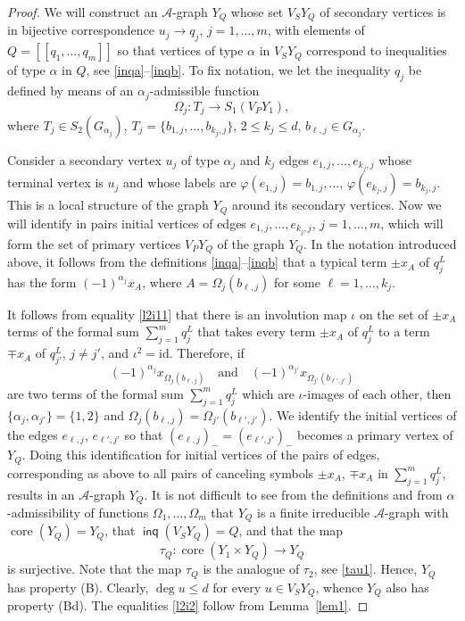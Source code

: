 \documentclass[10pt, reqno]{amsart}
\numberwithin{equation}{section}
\begin{document}
\begin{proof} We will construct an ${\mathcal{A}}$-graph $Y_Q$ whose set $V_S Y_Q$   of secondary vertices is in bijective correspondence $u_j \to q_j$, $j=1, \dots, m$, with elements of $Q = [[ q_1, \dots, q_m ]]$ so that vertices of type ${\alpha}$ in  $V_S Y_Q$ correspond to inequalities of type ${\alpha}$ in $Q$, see \eqref{inqa}--\eqref{inqb}. To fix notation, we
let the inequality  $q_j$ be defined by means of an ${\alpha}_j$-admissible function
$$
{\Omega}_j : T_j \to S_1( V_P Y_1) ,
$$
where $T_j \in S_2(G_{{\alpha}_j})$, $T_j = \{ b_{1,j}, \dots, b_{k_j, j}\}$,
 $2 \le  k_j \le d$, $b_{\ell, j} \in  G_{{\alpha}_j}$.

 Consider a secondary vertex $u_j$ of type ${\alpha}_j$ and $k_j$ edges $e_{1,j}, \dots, e_{k_j, j}$ whose terminal vertex is $u_j$ and whose labels are ${\varphi}(e_{1,j}) = b_{1,j}, \dots$, ${\varphi}(e_{k_j, j}) = b_{k_j, j}$.  This is a local structure of the graph $Y_Q$ around its secondary vertices.  Now we will  identify in pairs  initial vertices
 of  edges  $e_{1,j}, \dots, e_{k_j, j}$,  $j=1, \dots, m$,   which will form the set of primary vertices $V_P Y_Q$ of the graph $Y_Q$.  In the notation introduced above, it follows from the definitions \eqref{inqa}--\eqref{inqb} that a typical term  $\pm x_A$ of $q_j^L$ has the form  $(-1)^{{\alpha}_j}x_A$, where $A= { {\Omega}_j(b_{\ell,j})}$ for some $\ell = 1, \dots, k_j$.

It follows from equality \eqref{l2i11} that there is an involution map $\iota$ on the set of $\pm x_A$ terms of the formal sum $\sum_{j=1}^m q_j^L$ that takes every term  $\pm x_A$ of $q_j^L$ to a term  $\mp x_A$ of $q_{j'}^L$, $j \ne j'$, and $\iota^2 = \mbox{id}$. Therefore, if
$$
(-1)^{{\alpha}_j}x_{ {\Omega}_j(b_{\ell,j})} \quad \mbox{and} \quad  (-1)^{{\alpha}_{j'}}x_{ {\Omega}_{j'}(b_{\ell',j'})}
$$
are two terms of the formal sum $\sum_{j=1}^m q_j^L$ which are $\iota$-images of each other, then $\{ {\alpha}_{j},  {\alpha}_{j'} \} = \{ 1,2 \}$ and ${\Omega}_j(b_{\ell,j}) = {\Omega}_{j'}(b_{\ell',j'})$. We identify  the initial vertices of the edges $e_{ \ell,j}$,  $e_{ \ell', j'}$ so that $(e_{ \ell, j})_- = (e_{\ell', j'})_-$ becomes a primary vertex of  $Y_Q$.
Doing this identification  for initial vertices of the pairs of edges, corresponding as above to all pairs of  canceling symbols $\pm x_A$, $\mp x_A$ in $\sum_{j=1}^m q_j^L$, results in an ${\mathcal{A}}$-graph $Y_Q$.
It is not difficult to see from the definitions and from ${\alpha}$-admissibility of functions $\Omega_{1}, \dots,  \Omega_{m}$ that  $Y_Q$ is a  finite  irreducible ${\mathcal{A}}$-graph with $\operatorname{core}(Y_Q) = Y_Q$, that $\operatorname{\textsf{inq}}(V_S Y_Q) = Q$, and that the map
$$
\tau_Q : \operatorname{core}(  Y_1  \times  Y_Q ) \to Y_Q
$$
is surjective.  Note that the map  $\tau_Q$ is the analogue of $\tau_2$, see  \eqref{tau1}.
Hence, $Y_Q$  has property (B). Clearly,  $\deg u \le d$ for every $u \in V_S Y_Q$, whence $Y_Q$ also has property (Bd).
The equalities  \eqref{l2i2}  follow from Lemma~\ref{lem1}.
\end{proof}
\end{document}
